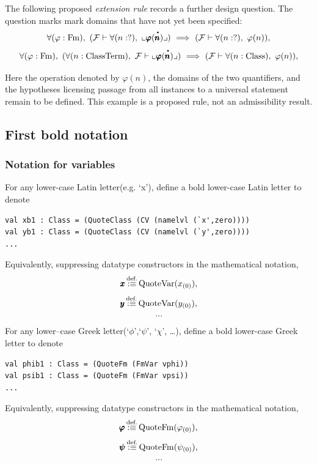 \begin{example}
The following proposed \textit{extension rule} records a further design question.
The question marks mark domains that have not yet been specified:
\[
\forall (\varphi:\Fm),\ %
(\Fau \vdash \forall (n:?),\ \llcorner \pmb{\varphi}(\boldmeta{n}) \lrcorner)
\IMPLIES
(\Fau \vdash \forall (n:?),\ \varphi(n) ),
\]
\[
\forall (\varphi:\Fm),\ %
(\forall (n:\ClassTerm),\ \Fau \vdash \llcorner \pmb{\varphi}(\boldmeta{n}) \lrcorner)
\IMPLIES
(\Fau \vdash \forall (n:\Class),\ \varphi(n) ),
\]

Here the operation denoted by $\varphi(n)$, the domains of the two quantifiers,
and the hypotheses licensing passage from all instances to a universal
statement remain to be defined. This example is a proposed rule, not an
admissibility result.
\end{example}

\iffalse %
\subsection{First bold notation}
\subsubsection{Notation for variables}
\begin{notation}
For any lower-case Latin letter(e.g. `x'), define a bold lower-case Latin letter to denote

\begin{lstlisting}
val xb1 : Class = (QuoteClass (CV (namelvl (`x',zero))))
val yb1 : Class = (QuoteClass (CV (namelvl (`y',zero))))
...
\end{lstlisting}
Equivalently, suppressing datatype constructors in the mathematical notation,
\[
\pmb{x} \,{\stackrel{{\textrm{def.}}}{:\equiv}}\, {\text{Quote}}\mathrm{Var}( x_{(0)} ),
\]
\[
\pmb{y} \,{\stackrel{{\textrm{def.}}}{:\equiv}}\, {\text{Quote}}\mathrm{Var}( y_{(0)} ),
\]
\[
\dots
\]
\end{notation}%

\begin{notation}
For any lower--case Greek letter(`{$\phi$}',`{$\psi$}', `{$\chi$}', \dots), define a bold lower-case Greek letter to denote
\begin{lstlisting}
val phib1 : Class = (QuoteFm (FmVar vphi))
val psib1 : Class = (QuoteFm (FmVar vpsi))
...
\end{lstlisting}
Equivalently, suppressing datatype constructors in the mathematical notation,
\[
\pmb{\varphi} \,{\stackrel{{\textrm{def.}}}{:\equiv}}\, {\text{Quote}}\mathrm{Fm}( \varphi_{(0)} ),
\]
\[
\pmb{\psi} \,{\stackrel{{\textrm{def.}}}{:\equiv}}\, {\text{Quote}}\mathrm{Fm}( \psi_{(0)} ),
\]
\[
\dots
\]
\end{notation}

